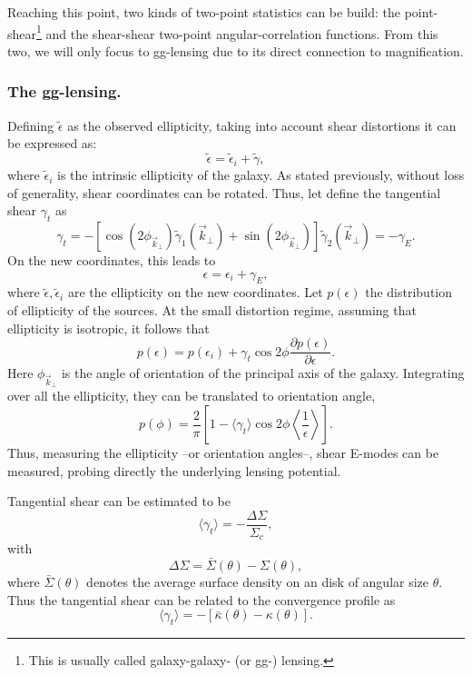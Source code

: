 Reaching this point, two kinds of two-point statistics can be build: the point-shear\footnote{This is usually called galaxy-galaxy- (or gg-) lensing.} and the shear-shear two-point angular-correlation functions. From this two, we will only focus to gg-lensing due to its direct connection to magnification.

\subsubsection{The gg-lensing.}
Defining $\tilde\epsilon$ as the observed ellipticity, taking into account shear distortions it can be expressed as:
\begin{equation}
\tilde\epsilon = \tilde\epsilon_i + \tilde\gamma,
\end{equation}
where $\tilde\epsilon_i$ is the intrinsic ellipticity of the galaxy. As stated previously, without loss of generality, shear coordinates can be rotated.  Thus, let define the tangential shear $\gamma_t$ as
\begin{equation}
\gamma_t = -[\cos(2\phi_{\vec k_\perp})\tilde \gamma_1(\vec k_\perp)+\sin(2\phi_{\vec k_\perp})]\tilde \gamma_2(\vec k_\perp) = -\gamma_E.
\end{equation}
On the new coordinates, this leads to
\begin{equation}
\epsilon = \epsilon_i+\gamma_E,
\end{equation}
where $\tilde\epsilon,\tilde\epsilon_i$ are the ellipticity on the new coordinates. Let $p(\epsilon)$ the distribution of ellipticity of the sources.  At the small distortion regime, assuming that ellipticity is isotropic, it follows that
\begin{equation}
p(\epsilon) = p(\epsilon_i)+\gamma_t\cos2\phi\frac{\partial p(\epsilon)}{\partial \epsilon}.
\end{equation}
Here $\phi_{\vec k_\perp}$ is the angle of orientation of the principal axis of the galaxy. Integrating over all the ellipticity, they can be translated to orientation angle,
\begin{equation}
p(\phi) = \frac{2}{\pi}\left[1-\langle\gamma_t\rangle\cos2\phi\left\langle\frac1{\epsilon}\right\rangle\right].
\end{equation}
Thus, measuring the ellipticity --or orientation angles--, shear E-modes can be measured, probing directly the underlying lensing potential.
\newline

Tangential shear can be estimated to be
\begin{equation}
\langle\gamma_t\rangle = -\frac{\Delta\Sigma}{\Sigma_c},
\end{equation}
with
\begin{equation}
\Delta\Sigma = \bar\Sigma(\theta)-\Sigma(\theta),
\end{equation}
where $\bar\Sigma(\theta)$ denotes the average surface density on an disk of angular size $\theta$. Thus the tangential shear can be related to the convergence profile as
\begin{equation}
\langle\gamma_t\rangle=-[\bar\kappa(\theta)-\kappa(\theta)].
\end{equation}
\newline

